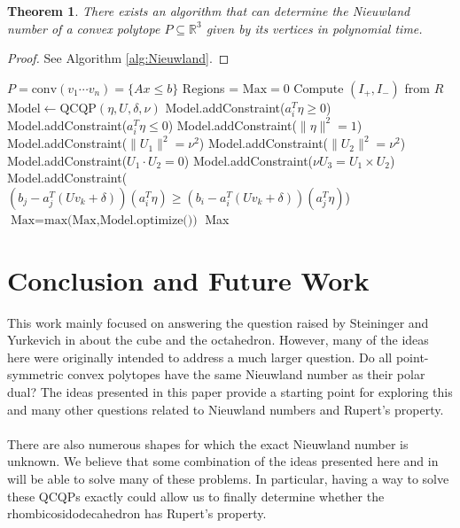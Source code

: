\documentclass[a4paper]{amsart}
\newtheorem{thm}{Theorem}
\theoremstyle{remark}
\begin{document}
\begin{thm}
	There exists an algorithm that can determine the Nieuwland number of a convex polytope $P \subseteq \mathbb{R}^3$ given by its vertices in polynomial time.
\end{thm}
\begin{proof}
	See Algorithm \ref{alg:Nieuwland}.
\end{proof}

\begin{algorithm}[H]
	\caption{Nieuwland Number Algorithm}\label{alg:Nieuwland}
	\begin{algorithmic}
		\Ensure $P = \textrm{conv}(v_1 \cdots v_n)=\{Ax \leq b\}$
		\State Regions = 
		\State $\textrm{Max} = 0$
		\State Compute $(I_+, I_-)$ from $R$
		\State $\textrm{Model} \gets \textrm{QCQP}(\eta, U, \delta, \nu)$
		\State Model.addConstraint($a_i^T \eta \geq 0$)
		\EndFor
		\State Model.addConstraint($a_i^T \eta \leq 0$)
		\EndFor
        \State Model.addConstraint($\lVert \eta \rVert^2 = 1$)
		\State Model.addConstraint($\lVert U_1 \rVert^2 = \nu^2$)
        \State Model.addConstraint($\lVert U_2 \rVert^2 = \nu^2$)
        \State Model.addConstraint($U_1 \cdot U_2 = 0$)
        \State Model.addConstraint($\nu U_3 = U_1 \times U_2$)
		\State Model.addConstraint($(b_j-a_j^T(Uv_k+\delta))(a_i^T\eta) \geq (b_i-a_i^T(Uv_k+\delta))(a_j^T\eta)$)
		\EndFor
		\EndFor
		\EndFor
		\State $\textrm{Max} = \textrm{max(Max,Model.optimize())}$
		\EndFor
		\State \Return Max
	\end{algorithmic}
\end{algorithm}

\section{Conclusion and Future Work}\label{sec:conclusion}

This work mainly focused on answering the question raised by Steininger and Yurkevich in \cite{StYu23} about the cube and the octahedron. However, many of the ideas here were originally intended to address a much larger question. Do all point-symmetric convex polytopes have the same Nieuwland number as their polar dual? The ideas presented in this paper provide a starting point for exploring this and many other questions related to Nieuwland numbers and Rupert's property.\\\\
There are also numerous shapes for which the exact Nieuwland number is unknown. We believe that some combination of the ideas presented here and in \cite{StYu25} will be able to solve many of these problems. In particular, having a way to solve these QCQPs exactly could allow us to finally determine whether the rhombicosidodecahedron has Rupert's property.
\end{document}
